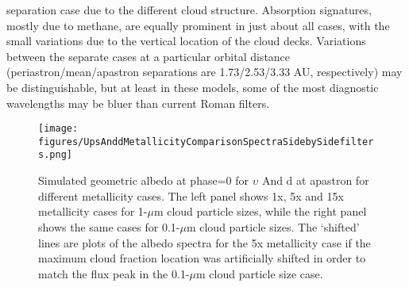 \documentclass[12pt, letterpaper]{aastex631}
\begin{document}
separation case due to the different cloud structure.  Absorption signatures, mostly due to methane, are equally prominent in just about all cases, with the small variations due to the vertical location of the cloud decks.   Variations between the separate cases at a particular orbital distance (periastron/mean/apastron separations are 1.73/2.53/3.33 AU, respectively) may be distinguishable, but at least in these models, some of the most diagnostic wavelengths may be bluer than current Roman filters.

 \begin{figure*}[t]
  \centering
  \texttt{[image: figures/UpsAnddMetallicityComparisonSpectraSidebySidefilters.png]}
  \caption{Simulated geometric albedo at phase=0 for $\upsilon$ And d at apastron for different metallicity cases.  The left panel shows 1x, 5x and 15x metallicity cases for 1-$\mu$m cloud particle sizes, while the right panel shows the same cases for 0.1-$\mu$m cloud particle sizes.  The `shifted' lines are plots of the albedo spectra for the 5x metallicity case if the maximum cloud fraction location was artificially shifted in order to match the flux peak in the 0.1-$\mu$m cloud particle size case.}
  \label{fig:UpsAnddmetalcompare}
\end{figure*}
\end{document}
